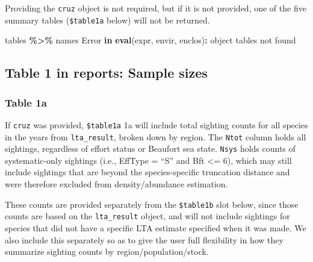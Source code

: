 \documentclass[
]{book}
\newenvironment{Shaded}{\begin{snugshade}}{\end{snugshade}}
\newcommand{\ControlFlowTok}[1]{\textcolor[rgb]{0.13,0.29,0.53}{\textbf{#1}}}
\newcommand{\FunctionTok}[1]{\textcolor[rgb]{0.13,0.29,0.53}{\textbf{#1}}}
\newcommand{\NormalTok}[1]{#1}
\newcommand{\SpecialCharTok}[1]{\textcolor[rgb]{0.81,0.36,0.00}{\textbf{#1}}}
\newcommand{\StringTok}[1]{\textcolor[rgb]{0.31,0.60,0.02}{#1}}
\begin{document}
Providing the \texttt{cruz} object is not required, but if it is not provided, one of the five summary tables (\texttt{\$table1a} below) will not be returned.

\begin{Shaded}
\begin{Highlighting}[]
\NormalTok{tables }\SpecialCharTok{\%\textgreater{}\%}\NormalTok{ names}
\NormalTok{Error }\ControlFlowTok{in} \FunctionTok{eval}\NormalTok{(expr, envir, enclos)}\SpecialCharTok{:}\NormalTok{ object }\StringTok{\textquotesingle{}tables\textquotesingle{}}\NormalTok{ not found}
\end{Highlighting}
\end{Shaded}

\hypertarget{table-1-in-reports-sample-sizes}{%
\subsection*{Table 1 in reports: Sample sizes}\label{table-1-in-reports-sample-sizes}}

\hypertarget{table-1a}{%
\subsubsection*{Table 1a}\label{table-1a}}

If \texttt{cruz} was provided, \texttt{\$table1a} 1a will include total sighting counts for all species in the years from \texttt{lta\_result}, broken down by region. The \texttt{Ntot} column holds all sightings, regardless of effort status or Beaufort sea state. \texttt{Nsys} holds counts of systematic-only sightings (i.e., EffType = ``S'' and Bft \textless= 6), which may still include sightings that are beyond the species-specific truncation distance and were therefore excluded from density/abundance estimation.

These counts are provided separately from the \texttt{\$table1b} slot below, since those counts are based on the \texttt{lta\_result} object, and will not include sightings for species that did not have a specific LTA estimate specified when it was made. We also include this separately so as to give the user full flexibility in how they summarize sighting counts by region/population/stock.
\end{document}
